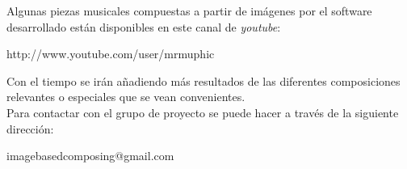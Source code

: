 Algunas piezas musicales compuestas a partir de imágenes por el software desarrollado están disponibles en este canal de \emph{youtube}:

\begin{center}
http://www.youtube.com/user/mrmuphic
\end{center}

Con el tiempo se irán añadiendo más resultados de las diferentes composiciones relevantes o especiales que se vean convenientes.\\

Para contactar con el grupo de proyecto se puede hacer a través de la siguiente dirección:

\begin{center}
	imagebasedcomposing@gmail.com
\end{center}